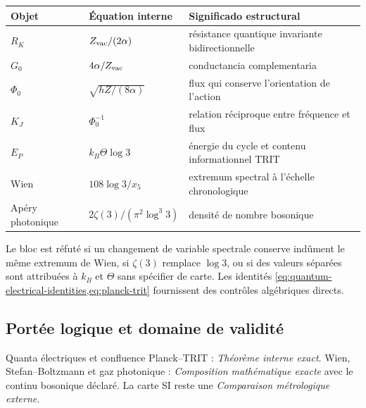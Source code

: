 \begin{longtable}{@{}p{}p{}p{}@{}}
\toprule
Objet & Équation interne & Significado estructural\\
\midrule
\endhead
\(R_K\) & \(Z_{\rm vac}/(2\alpha)\) & résistance quantique invariante bidirectionnelle\\
\(G_0\) & \(4\alpha/Z_{\rm vac}\) & conductancia complementaria\\
\(\Phi_0\) & \(\sqrt{hZ/(8\alpha)}\) & flux qui conserve l'orientation de l'action\\
\(K_J\) & \(\Phi_0^{-1}\) & relation réciproque entre fréquence et flux\\
\(E_P\) & \(k_B\Theta\log3\) & énergie du cycle et contenu informationnel TRIT\\
Wien & \(108\log3/x_5\) & extremum spectral à l'échelle chronologique\\
Apéry photonique & \(2\zeta(3)/(\pi^2\log^3 3)\) & densité de nombre bosonique\\
\bottomrule
\end{longtable}

\begin{remark}
Le bloc est réfuté si un changement de variable spectrale conserve
indûment le même extremum de Wien, si \(\zeta(3)\) remplace
\(\log3\), ou si des valeurs séparées sont attribuées à \(k_B\) et \(\Theta\) sans
spécifier de carte. Les identités
\cref{eq:quantum-electrical-identities,eq:planck-trit} fournissent des contrôles
algébriques directs.
\end{remark}

\subsection*{Portée logique et domaine de validité}
Quanta électriques et confluence Planck--TRIT : \emph{Théorème interne exact}. Wien, Stefan--Boltzmann et gaz photonique : \emph{Composition mathématique exacte} avec le continu bosonique déclaré. La carte SI reste une \emph{Comparaison métrologique externe}.

